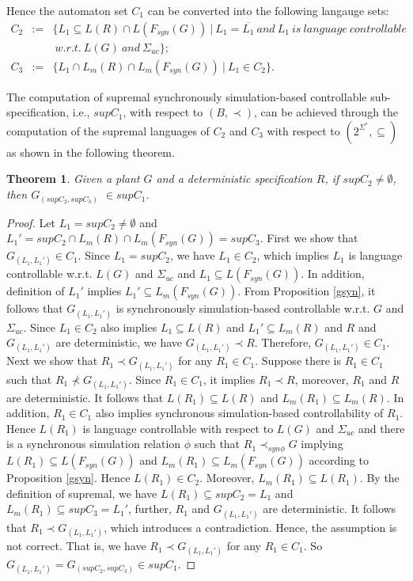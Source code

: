 \documentclass[preprint,authoryear,12pt]{elsarticle}
\newtheorem{Theorem}{Theorem}
\begin{document}
Hence the automaton set $C_1$ can be converted into the following
langauge sets:
\begin{eqnarray}
C_2 &:=& \{L_1 \subseteq L(R) \cap L(F_{syn}(G))~|~
L_1=\overline{L_1}
~and~ L_1 ~is ~language ~controllable \nonumber \\
& &  ~w.r.t.~ L(G) ~and~ \Sigma_{uc}\}; \nonumber \\
C_3 &:=& \{L_1 \cap L_{m}(R) \cap L_{m}(F_{syn}(G))~|~L_1 \in
C_2\}. \nonumber
\end{eqnarray}

The computation of supremal synchronously simulation-based
controllable sub-specification, i.e., $supC_1$, with respect to
$(B, \prec)$, can be achieved through the computation of the
supremal languages of $C_2$ and $C_3$ with respect to
$(2^{\Sigma^{*}}, \subseteq)$ as shown in the following theorem.



\begin{Theorem}\label{supeq}
Given a plant $G$ and a deterministic specification $R$, if
$supC_2 \neq \emptyset$, then $G_{(supC_2,\! supC_3)}$ $\in
supC_1$.
\end{Theorem}
\begin{proof}
Let $L_1\!=supC_2\!\neq \emptyset$ and $L_1'\!=supC_2 \!\cap
L_{m}(R) \!\cap L_{m}(F_{syn}(G))\!=supC_3$. First we show that
$G_{(L_1, L_1')}\!\in C_1$. Since $L_1 \!= supC_2$, we have $L_1
\!\in C_2$, which implies $L_1$ is language controllable w.r.t.
$L(G)$ and $\Sigma_{uc}$ and $L_1  \!\subseteq L(F_{syn}(G))$. In
addition, definition of $L_1'$ implies $L_1' \!\subseteq
L_{m}(F_{syn}(G))$. From Proposition \ref{gsyn}, it follows that
$G_{(L_1, L_1')}$ is synchronously simulation-based controllable
w.r.t. $G$ and $\Sigma_{uc}$. Since $L_1 \! \in C_2$ also implies
$L_1 \!\subseteq L(R)$ and $L_1' \!\subseteq L_{m}(R)$ and $R$ and
$G_{(L_1, L_1')}$ are deterministic, we have $G_{(L_1, L_1')}\!
\prec R$. Therefore, $G_{(L_1, L_1')}\! \in C_1$. Next we show
that $R_1 \!\prec G_{(L_1, L_1')}$ for any $R_1 \in C_1$. Suppose
there is $R_1 \! \in C_1$ such that $R_1 \! \nprec G_{(L_1,
L_1')}$. Since $R_1 \! \in C_1$, it implies $R_1 \! \prec R$,
moreover, $R_1$ and $R$ are deterministic. It follows that $L(R_1)
\! \subseteq L(R)$ and $L_{m}(R_1) \! \subseteq L_{m}(R)$. In
addition, $R_1 \! \in C_1$ also implies synchronous
simulation-based controllability of $R_1$. Hence $L(R_1)$ is
language controllable with respect to $L(G)$ and $\Sigma_{uc}$ and
there is a synchronous simulation relation $\phi$ such that $R_1
\! \prec_{syn\phi} G$ implying $L(R_1) \! \subseteq L(F_{syn}(G))$
and $L_{m}(R_1) \!\subseteq L_{m}(F_{syn}(G))$ according to
Proposition \ref{gsyn}. Hence $L(R_1)\! \in C_2$. Moreover,
$L_{m}(R_1) \! \subseteq L(R_1)$. By the definition of supremal,
we have $L(R_1) \! \subseteq supC_2\!= L_1$ and $L_{m}(R_1) \!
\subseteq supC_3 \!=L_1'$, further, $R_1$ and $G_{(L_1, L_1')}$
are deterministic. It follows that $R_1\!\prec G_{(L_1, L_1')}$,
which introduces a contradiction. Hence, the assumption is not
correct. That is, we have $R_1 \! \prec G_{(L_1, L_1')}$ for any
$R_1 \!\in C_1$. So $G_{(L_1, L_1')} \!=G_{(supC_2, supC_3)} \!
\in supC_1$.

\end{proof}
\end{document}
